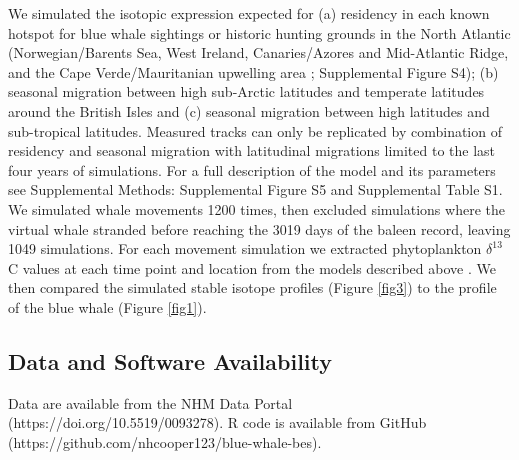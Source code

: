 \documentclass[a4paper,12pt]{article}
\begin{document}
We simulated the isotopic expression expected for (a) residency in each known hotspot for blue whale sightings or historic hunting grounds in the North Atlantic (Norwegian/Barents Sea, West Ireland, Canaries/Azores and Mid-Atlantic Ridge, and the Cape Verde/Mauritanian upwelling area \cite{mcdonald2006biogeographic,reilly2008balaenoptera,sigurjonsson1995life}; Supplemental Figure S4); (b) seasonal migration between high sub-Arctic latitudes and temperate latitudes around the British Isles and (c) seasonal migration between high latitudes and sub-tropical latitudes. 
Measured tracks can only be replicated by combination of residency and seasonal migration with latitudinal migrations limited to the last four years of simulations.
For a full description of the model and its parameters see Supplemental Methods: Supplemental Figure S5 and Supplemental Table S1. 
We simulated whale movements 1200 times, then excluded simulations where the virtual whale stranded before reaching the 3019 days of the baleen record, leaving 1049 simulations.
For each movement simulation we extracted phytoplankton $\delta^{13}$C values at each time point and location from the models described above \cite{magozzi2017using}. 
We then compared the simulated stable isotope profiles (Figure \ref{fig3}) to the profile of the blue whale (Figure \ref{fig1}).
 
\subsection{Data and Software Availability}
Data are available from the NHM Data Portal (https://doi.org/10.5519/0093278). 
R code is available from GitHub (https://github.com/nhcooper123/blue-whale-bes).


\end{document}
